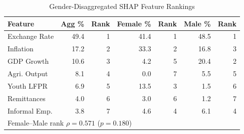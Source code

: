 \begin{table}[ht]
\caption{Gender-Disaggregated SHAP Feature Rankings}
\label{tab:gender_shap}
\setlength{\tabcolsep}{3pt}
\footnotesize
\begin{tabular}{lrrrrrr}
\toprule
\textbf{Feature} & \textbf{Agg \%} & \textbf{Rank} & \textbf{Female \%} & \textbf{Rank} & \textbf{Male \%} & \textbf{Rank}\\
\midrule
Exchange Rate & 49.4 & 1 & 41.4 & 1 & 48.5 & 1\\
Inflation & 17.2 & 2 & 33.3 & 2 & 16.8 & 3\\
GDP Growth & 10.6 & 3 & 4.2 & 5 & 20.4 & 2\\
Agri. Output & 8.1 & 4 & 0.0 & 7 & 5.5 & 5\\
Youth LFPR & 6.9 & 5 & 13.5 & 3 & 1.5 & 6\\
Remittances & 4.0 & 6 & 3.0 & 6 & 1.2 & 7\\
Informal Emp. & 3.8 & 7 & 4.6 & 4 & 6.1 & 4\\
\midrule
\multicolumn{7}{l}{\scriptsize Female--Male rank $\rho = 0.571$ ($p = 0.180$)}\\
\bottomrule
\end{tabular}
\end{table}
